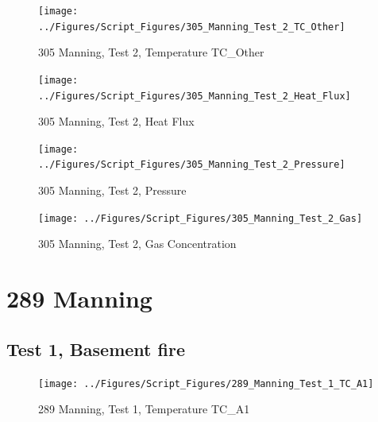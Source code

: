 \documentclass[12pt,oneside]{book}
\begin{document}
\begin{figure}[!ht]
\texttt{[image: ../Figures/Script\_Figures/305\_Manning\_Test\_2\_TC\_Other]}
\caption{305 Manning, Test 2, Temperature TC\_Other}
\label{fig:305_Manning_Test_2_TC_Other}
\end{figure}

\begin{figure}[!ht]
\texttt{[image: ../Figures/Script\_Figures/305\_Manning\_Test\_2\_Heat\_Flux]}
\caption{305 Manning, Test 2, Heat Flux}
\label{fig:305_Manning_Test_2_Heat_Flux}
\end{figure}

\begin{figure}[!ht]
\texttt{[image: ../Figures/Script\_Figures/305\_Manning\_Test\_2\_Pressure]}
\caption{305 Manning, Test 2, Pressure}
\label{fig:305_Manning_Test_2_Pressure}
\end{figure}

\begin{figure}[!ht]
\texttt{[image: ../Figures/Script\_Figures/305\_Manning\_Test\_2\_Gas]}
\caption{305 Manning, Test 2, Gas Concentration}
\label{fig:305_Manning_Test_2_Gas}
\end{figure}







\clearpage


\section{289 Manning}

\subsection{Test 1, Basement fire}

\begin{figure}[!ht]
\texttt{[image: ../Figures/Script\_Figures/289\_Manning\_Test\_1\_TC\_A1]}
\caption{289 Manning, Test 1, Temperature TC\_A1}
\label{fig:289_Manning_Test_1_TC_A1}
\end{figure}
\end{document}

